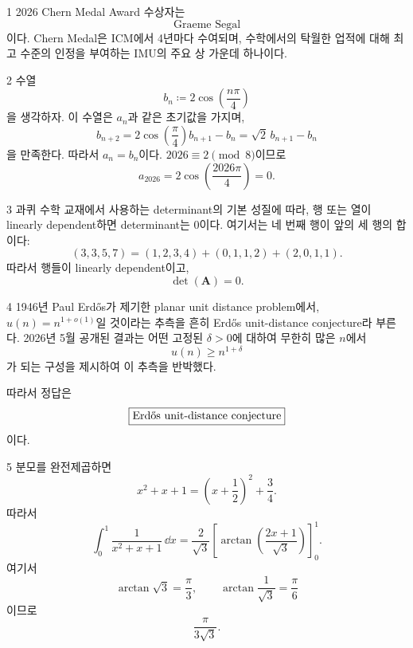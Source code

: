 \documentclass[11pt,oneside]{article}
\begin{document}

\begin{problemsolution}{1}
2026 Chern Medal Award 수상자는
\[
    \boxed{\text{Graeme Segal}}
\]
이다. Chern Medal은 ICM에서 4년마다 수여되며, 수학에서의 탁월한 업적에 대해 최고 수준의 인정을 부여하는 IMU의 주요 상 가운데 하나이다.
\end{problemsolution}

\begin{problemsolution}{2}
수열
\[
    b_n\coloneqq 2\cos\left(\frac{n\pi}{4}\right)
\]
을 생각하자. 이 수열은 $a_n$과 같은 초기값을 가지며,
\[
    b_{n+2}
    =
    2\cos\left(\frac{\pi}{4}\right)b_{n+1}-b_n
    =
    \sqrt2\,b_{n+1}-b_n
\]
을 만족한다. 따라서 $a_n=b_n$이다. $2026\equiv2\pmod8$이므로
\[
    \boxed{
        a_{2026}
        =
        2\cos\left(\frac{2026\pi}{4}\right)
        =0
    }.
\]
\end{problemsolution}

\begin{problemsolution}{3}
과퀴 수학 교재에서 사용하는 determinant의 기본 성질에 따라, 행 또는 열이 linearly dependent하면 determinant는 $0$이다. 여기서는 네 번째 행이 앞의 세 행의 합이다:
\[
    (3,3,5,7)
    =
    (1,2,3,4)
    +(0,1,1,2)
    +(2,0,1,1).
\]
따라서 행들이 linearly dependent이고,
\[
    \boxed{\det(\mathbf{A})=0}.
\]
\end{problemsolution}

\begin{problemsolution}{4}
1946년 Paul Erdős가 제기한 planar unit distance problem에서, $u(n)=n^{1+o(1)}$일 것이라는 추측을 흔히 Erdős unit-distance conjecture라 부른다. 2026년 5월 공개된 결과는 어떤 고정된 $\delta>0$에 대하여 무한히 많은 $n$에서
\[
    u(n)\geq n^{1+\delta}
\]
가 되는 구성을 제시하여 이 추측을 반박했다.

따라서 정답은
\[
    \boxed{\text{Erd\H{o}s unit-distance conjecture}}
\]
이다.
\end{problemsolution}

\begin{problemsolution}{5}
분모를 완전제곱하면
\[
    x^2+x+1
    =
    \left(x+\frac12\right)^2+\frac34.
\]
따라서
\[
    \int_0^1\frac{1}{x^2+x+1}\,\dd x
    =
    \frac{2}{\sqrt3}
    \left[
        \arctan\left(\frac{2x+1}{\sqrt3}\right)
    \right]_0^1.
\]
여기서
\[
    \arctan\sqrt3=\frac{\pi}{3},
    \qquad
    \arctan\frac{1}{\sqrt3}=\frac{\pi}{6}
\]
이므로
\[
    \boxed{\frac{\pi}{3\sqrt3}}.
\]
\end{problemsolution}
\end{document}
